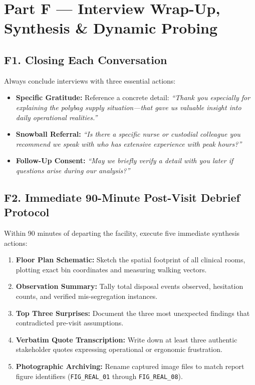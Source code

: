 \documentclass[11pt,a4paper]{article}
\begin{document}
\section{Part F --- Interview Wrap-Up, Synthesis \& Dynamic Probing}

\subsection{F1. Closing Each Conversation}
Always conclude interviews with three essential actions:
\begin{itemize}[leftmargin=*, nosep]
    \item \textbf{Specific Gratitude:} Reference a concrete detail: \emph{``Thank you especially for explaining the polybag supply situation---that gave us valuable insight into daily operational realities.''}
    \item \textbf{Snowball Referral:} \emph{``Is there a specific nurse or custodial colleague you recommend we speak with who has extensive experience with peak hours?''}
    \item \textbf{Follow-Up Consent:} \emph{``May we briefly verify a detail with you later if questions arise during our analysis?''}
\end{itemize}

\subsection{F2. Immediate 90-Minute Post-Visit Debrief Protocol}
Within 90 minutes of departing the facility, execute five immediate synthesis actions:
\begin{enumerate}[leftmargin=*, nosep]
    \item \textbf{Floor Plan Schematic:} Sketch the spatial footprint of all clinical rooms, plotting exact bin coordinates and measuring walking vectors.
    \item \textbf{Observation Summary:} Tally total disposal events observed, hesitation counts, and verified mis-segregation instances.
    \item \textbf{Top Three Surprises:} Document the three most unexpected findings that contradicted pre-visit assumptions.
    \item \textbf{Verbatim Quote Transcription:} Write down at least three authentic stakeholder quotes expressing operational or ergonomic frustration.
    \item \textbf{Photographic Archiving:} Rename captured image files to match report figure identifiers (\texttt{FIG\_REAL\_01} through \texttt{FIG\_REAL\_08}).
\end{enumerate}
\end{document}
